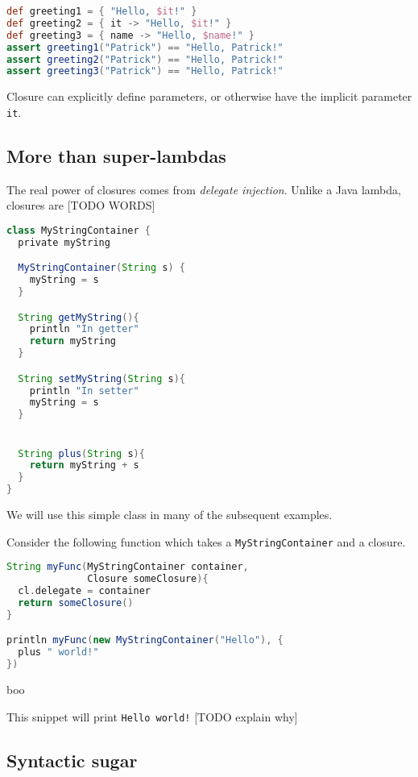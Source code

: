\documentclass[]{article}
\theoremstyle{definition}
\newcommand{\startSnippetFig}{%
\begin{snippet}
  \begin{minipage}[c]{.9\textwidth}
    \begin{framed}
}
\newcommand{\stopSnippetFig}{%
    \end{framed}
  \end{minipage}
\end{snippet}
}
\begin{document}
\startSnippetFig
\begin{lstlisting}[language=Groovy]
def greeting1 = { "Hello, $it!" }
def greeting2 = { it -> "Hello, $it!" }
def greeting3 = { name -> "Hello, $name!" }
assert greeting1("Patrick") == "Hello, Patrick!"
assert greeting2("Patrick") == "Hello, Patrick!"
assert greeting3("Patrick") == "Hello, Patrick!"
\end{lstlisting}
\caption{Closure can explicitly define parameters, or otherwise have the implicit parameter \texttt{it}.}
\label{snip:implicit-params}
\stopSnippetFig

\subsection{More than super-lambdas}
\label{sec:super-lambdas}
The real power of closures comes from \emph{delegate injection}.
Unlike a Java lambda, closures are [TODO WORDS]

\startSnippetFig
\begin{lstlisting}[language=Groovy]
class MyStringContainer {
  private myString

  MyStringContainer(String s) {
    myString = s
  }

  String getMyString(){
    println "In getter"
    return myString
  }

  String setMyString(String s){
    println "In setter"
    myString = s
  }


  String plus(String s){
    return myString + s
  }
}
\end{lstlisting}
    \caption{We will use this simple class in many of the subsequent examples.}
    \label{snip:container}
\stopSnippetFig


Consider the following function which takes a \texttt{MyStringContainer} and a closure.

\startSnippetFig
\begin{lstlisting}[language=Groovy]
String myFunc(MyStringContainer container,
              Closure someClosure){
  cl.delegate = container
  return someClosure()
}

println myFunc(new MyStringContainer("Hello"), {
  plus " world!"
})
\end{lstlisting}
\caption{boo}
\label{snip:boo}
\stopSnippetFig

This snippet will print \texttt{Hello world!}  [TODO explain why]

\subsection{Syntactic sugar}
\end{document}
